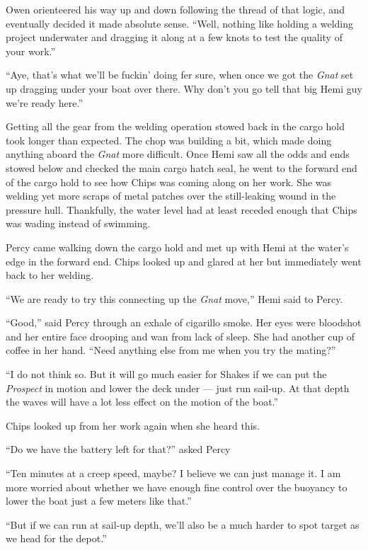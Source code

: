\documentclass[
]{scrbook}
\begin{document}
Owen orienteered his way up and down following the thread of that logic,
and eventually decided it made absolute sense. ``Well, nothing like
holding a welding project underwater and dragging it along at a few
knots to test the quality of your work.''

``Aye, that's what we'll be fuckin' doing fer sure, when once we got the
\emph{Gnat} set up dragging under your boat over there. Why don't you go
tell that big Hemi guy we're ready here.''

\bigskip

Getting all the gear from the welding operation stowed back in the cargo
hold took longer than expected. The chop was building a bit, which made
doing anything aboard the \emph{Gnat} more difficult. Once Hemi saw all
the odds and ends stowed below and checked the main cargo hatch seal, he
went to the forward end of the cargo hold to see how Chips was coming
along on her work. She was welding yet more scraps of metal patches over
the still-leaking wound in the pressure hull. Thankfully, the water
level had at least receded enough that Chips was wading instead of
swimming.

Percy came walking down the cargo hold and met up with Hemi at the
water's edge in the forward end. Chips looked up and glared at her but
immediately went back to her welding.

``We are ready to try this connecting up the \emph{Gnat} move,'' Hemi
said to Percy.

``Good,'' said Percy through an exhale of cigarillo smoke. Her eyes were
bloodshot and her entire face drooping and wan from lack of sleep. She
had another cup of coffee in her hand. ``Need anything else from me when
you try the mating?''

``I do not think so. But it will go much easier for Shakes if we can put
the \emph{Prospect} in motion and lower the deck under --- just run
sail-up. At that depth the waves will have a lot less effect on the
motion of the boat.''

Chips looked up from her work again when she heard this.

``Do we have the battery left for that?'' asked Percy

``Ten minutes at a creep speed, maybe? I believe we can just manage it.
I am more worried about whether we have enough fine control over the
buoyancy to lower the boat just a few meters like that.''

``But if we can run at sail-up depth, we'll also be a much harder to
spot target as we head for the depot.''
\end{document}
